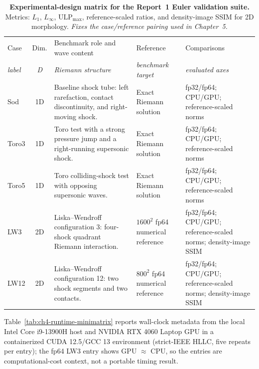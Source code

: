 \begin{table}[htbp]
\centering
\small
\begin{tabularx}{\textwidth}{@{}l c >{\raggedright\arraybackslash}X >{\raggedright\arraybackslash}X >{\raggedright\arraybackslash}X@{}}
\toprule
Case & Dim. & Benchmark role and wave content & Reference & Comparisons \\
\itshape label & \itshape D & \itshape Riemann structure & \itshape benchmark target & \itshape evaluated axes \\
\midrule \addlinespace[2pt]
Sod & 1D & Baseline shock tube: left rarefaction, contact discontinuity, and right-moving shock. & Exact Riemann solution & fp32/fp64; CPU/GPU; reference-scaled norms \\
\addlinespace
Toro3 & 1D & Toro test with a strong pressure jump and a right-running supersonic shock. & Exact Riemann solution & fp32/fp64; CPU/GPU; reference-scaled norms \\
\addlinespace
Toro5 & 1D & Toro colliding-shock test with opposing supersonic waves. & Exact Riemann solution & fp32/fp64; CPU/GPU; reference-scaled norms \\
\addlinespace
LW3 & 2D & Liska--Wendroff configuration 3: four-shock quadrant Riemann interaction. & \(1600^2\) fp64 numerical reference & fp32/fp64; CPU/GPU; reference-scaled norms; density-image SSIM \\
\addlinespace
LW12 & 2D & Liska--Wendroff configuration 12: two shock segments and two contacts. & \(800^2\) fp64 numerical reference & fp32/fp64; CPU/GPU; reference-scaled norms; density-image SSIM \\
\bottomrule
\end{tabularx}
\caption[Experimental-design matrix for the Report~1 Euler validation suite]{\textbf{Experimental-design matrix for the Report~1 Euler validation suite.}
  Metrics: \(L_1\), \(L_\infty\), \(\mathrm{ULP}_{\max}\), reference-scaled ratios, and density-image SSIM for 2D morphology.
  \emph{Fixes the case/reference pairing used in Chapter~5.}}
\label{tab:ch4-design-matrix}
\end{table}

Table~\ref{tab:ch4-runtime-minimatrix} reports wall-clock metadata
from the local Intel Core i9-13900H host and NVIDIA RTX 4060 Laptop GPU in a
containerized CUDA 12.5/GCC 13 environment (strict-IEEE HLLC, five repeats per entry);
the fp64 LW3 entry shows GPU \(\approx\) CPU, so the entries are computational-cost
context, not a portable timing result.

